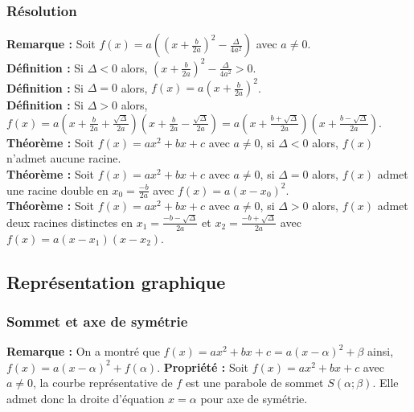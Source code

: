 \documentclass[a4paper,titlepage]{article}
\begin{document}
        \subsubsection{Résolution}
            \textbf{Remarque :} Soit $f\left(x\right)=a\left(\left(x+\frac{b}{2a}\right)^{2}-\frac{\varDelta}{4a^{2}}\right)$ avec $a\neq0$.
            \\
            \textbf{Définition :} Si $\varDelta<0$ alors, $\left(x+\frac{b}{2a}\right)^{2}-\frac{\varDelta}{4a^{2}}>0$.
            \\
            \textbf{Définition :} Si $\varDelta=0$ alors, $f\left(x\right)=a\left(x+\frac{b}{2a}\right)^{2}$.
            \\
            \textbf{Définition :} Si $\varDelta>0$ alors,  $f\left(x\right)=a\left(x+\frac{b}{2a}+\frac{\sqrt{\varDelta}}{2a}\right)\left(x+\frac{b}{2a}-\frac{\sqrt{\varDelta}}{2a}\right)=a\left(x+\frac{b+\sqrt{\varDelta}}{2a}\right)\left(x+\frac{b-\sqrt{\varDelta}}{2a}\right)$.
            \\
            \textbf{Théorème :} Soit $f\left(x\right)=ax^{2}+bx+c$ avec $a\neq0$, si $\varDelta<0$ alors, $f\left(x\right)$ n’admet aucune racine.
            \\
            \textbf{Théorème :} Soit $f\left(x\right)=ax^{2}+bx+c$ avec $a\neq0$, si $\varDelta=0$ alors, $f\left(x\right)$ admet une racine double en $x_{0}=\frac{-b}{2a}$ avec $f\left(x\right)=a\left(x-x_{0}\right)^{2}$.
            \\
            \textbf{Théorème :} Soit $f\left(x\right)=ax^{2}+bx+c$ avec $a\neq0$, si $\varDelta>0$ alors, $f\left(x\right)$ admet deux racines distinctes en $x_{1}=\frac{-b-\sqrt{\varDelta}}{2a}$ et $x_{2}=\frac{-b+\sqrt{\varDelta}}{2a}$ avec $f\left(x\right)=a\left(x-x_{1}\right)\left(x-x_{2}\right)$.
    \subsection{Représentation graphique}
        \subsubsection{Sommet et axe de symétrie}
            \textbf{Remarque :} On a montré que $f\left(x\right)=ax^{2}+bx+c=a\left(x-\alpha\right)^{2}+\beta$ ainsi, $f\left(x\right)=a\left(x-\alpha\right)^{2}+f\left(\alpha\right)$.
            \textbf{Propriété :} Soit $f\left(x\right)=ax^{2}+bx+c$ avec $a\neq0$, la courbe représentative de $f$ est une parabole de sommet $S\left(\alpha;\beta\right)$. Elle admet donc la droite d’équation $x=\alpha$ pour axe de symétrie.
\end{document}
